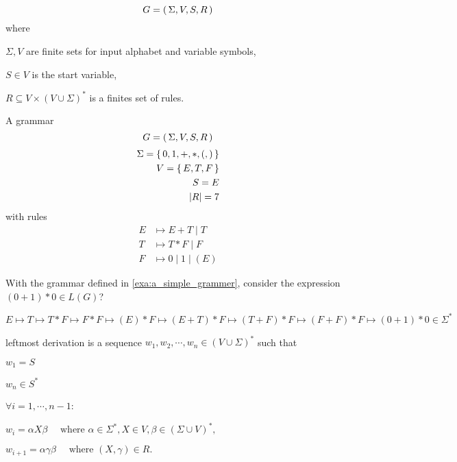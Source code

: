
\[
    G = { \left(\,\Sigma, V, S, R\,\right) }
\]
where
\begin{compactitem}
\item
    $\Sigma, V$ are finite sets for input alphabet and variable symbols,
\item
    $S \in V$ is the start variable,
\item
    $R \subseteq V \times (V \cup \Sigma)^*$ is a finites set of rules.
\end{compactitem}

\begin{example}
    \label{exa:a_simple_grammer}
    A grammar 
    \[
        G = { \left(\,\Sigma, V, S, R\,\right) }
    \]
    \begin{align*}
        \Sigma = { \left\{\,0,1,+,*,(,)\,\right\} }  \\
        V = { \left\{\,E,T,F\,\right\} }             \\
        S = E                       \\
        { \left\lvert R \right\rvert } = 7
    \end{align*}
    with rules
    \begin{align*}
        E &\mapsto E + T \mid T      \\
        T &\mapsto T * F \mid F      \\
        F &\mapsto 0 \mid 1 \mid (E)
    \end{align*}
\end{example}

\begin{example}[Is $(0+1)*0$ in $L(G)$?]
    With the grammar defined in \autoref{exa:a_simple_grammer}, 
    consider the expression $(0+1)*0 \in L(G)$?

    \[
        E \mapsto T \mapsto T*F \mapsto F*F \mapsto (E)*F \mapsto (E+T)*F
        \mapsto (T+F)*F \mapsto (F+F)*F \mapsto (0+1)*0 \in \Sigma^*
    \]
\end{example}

\begin{definition}
    leftmost derivation
    is a sequence 
    $w_1, w_2, \cdots, w_n \in (V \cup \Sigma)^*$ 
    such that 
    \begin{compactitem}
    \item $w_1 = S$
    \item $w_n \in S^*$
    \item $\forall i = 1, \cdots, n-1$:
        \begin{compactitem}
        \item
            $w_i = \alpha X \beta \quad \text{ where }
            \alpha \in \Sigma^*, X \in V, \beta \in (\Sigma \cup V)^*,$
        \item
            $w_{i+1} = \alpha \gamma \beta \quad \text{ where }
            (X, \gamma) \in R.$
        \end{compactitem}
    \end{compactitem}
\end{definition}

